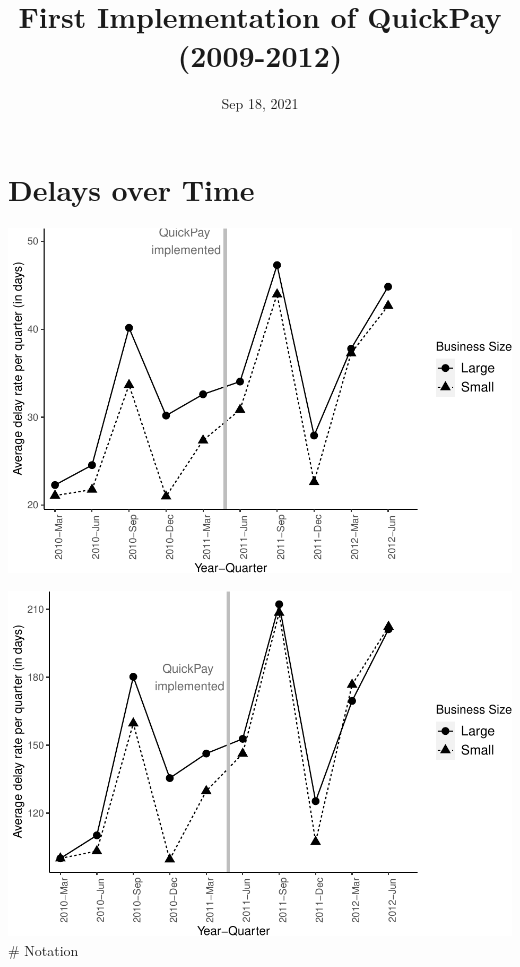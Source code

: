 \documentclass[
]{article}
\title{First Implementation of QuickPay (2009-2012)}
\author{}
\date{\vspace{-2.5em}Sep 18, 2021}
\begin{document}
\maketitle

\hypertarget{delays-over-time}{%
\section{Delays over Time}\label{delays-over-time}}

\includegraphics{qp_first_implementation_files/figure-latex/plot-1.pdf}

\includegraphics{qp_first_implementation_files/figure-latex/normalized_plot-1.pdf}
\# Notation
\end{document}
